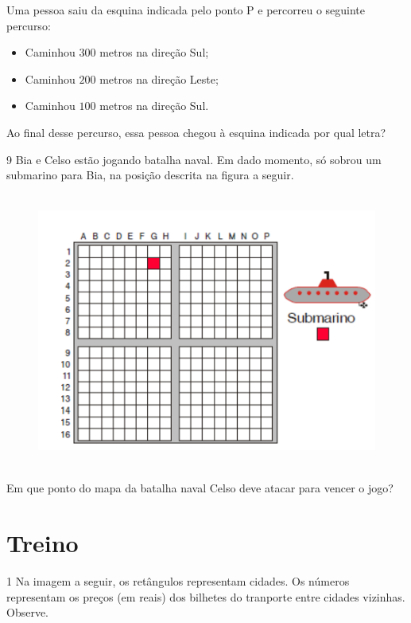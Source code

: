 {{{{Uma pessoa saiu da esquina indicada pelo ponto P e percorreu o seguinte
percurso:

\begin{itemize}
\item Caminhou $300$ metros na direção Sul;
\item Caminhou $200$ metros na direção Leste;
\item Caminhou $100$ metros na direção Sul.
\end{itemize}

Ao final desse percurso, essa pessoa chegou à esquina indicada por qual letra?


\num{9} Bia e Celso estão jogando batalha naval. Em dado momento, só sobrou
um submarino para Bia, na posição descrita na figura a seguir.

\begin{figure}[H]
\centering\includegraphics[width=5in,height=3.55208in]{./imgSAEB_6_MAT/media/image73.png}
\end{figure}

Em que ponto do mapa da batalha naval Celso deve atacar para vencer o jogo?


\section*{Treino}

\num{1}  Na imagem a seguir, os retângulos representam cidades. Os números
representam os preços (em reais) dos bilhetes do tranporte entre cidades vizinhas. Observe.

}}}}
